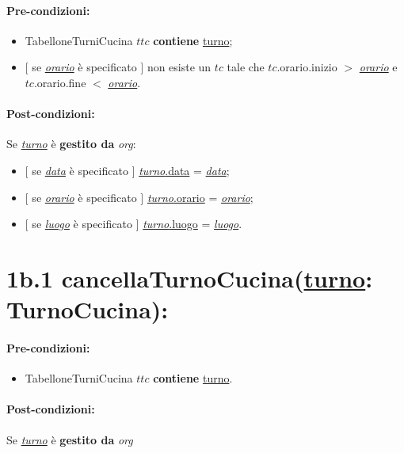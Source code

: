 \paragraph{Pre-condizioni:}

\begin{itemize}
 \item TabelloneTurniCucina $ttc$ \textbf{contiene} \underline{turno};
 \item $[$ se \underline{\textit{orario}} è specificato $]$ non esiste un $tc$ tale che $tc$.orario.inizio $>$ \underline{\textit{orario}} e $tc$.orario.fine $<$ \underline{\textit{orario}}.
\end{itemize}

\paragraph{Post-condizioni:} Se \underline{\textit{turno}} è \textbf{gestito da} \textit{org}:

\begin{itemize}
    \item $[$ se \underline{\textit{data}} è specificato $]$ \underline{\textit{turno}.data} = \underline{\textit{data}};

    \item $[$ se \underline{\textit{orario}} è specificato $]$ \underline{\textit{turno}.orario} = \underline{\textit{orario}};

    \item $[$ se \underline{\textit{luogo}} è specificato $]$ \underline{\textit{turno}.luogo} = \underline{\textit{luogo}}.

\end{itemize}

\section*{1b.1 cancellaTurnoCucina(\underline{turno}: TurnoCucina):}

\paragraph{Pre-condizioni:}

\begin{itemize}
  \item TabelloneTurniCucina $ttc$ \textbf{contiene} \underline{turno}.
\end{itemize}

\paragraph{Post-condizioni:} Se \underline{\textit{turno}} è \textbf{gestito da} {\textit{org}}

